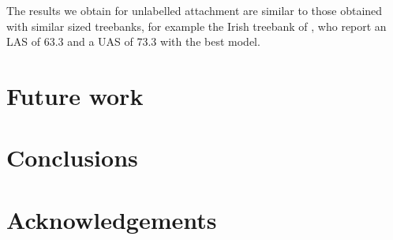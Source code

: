 \documentclass[a4paper,11pt, onecolumn,twoside]{article}
\begin{document}
The results we obtain for unlabelled attachment are similar to those obtained with similar 
sized treebanks, for example the Irish treebank of \cite{Lynn12}, who report an LAS of
63.3 and a UAS of 73.3 with the best model.


\section{Future work}




\section{Conclusions}

\section*{Acknowledgements}


%
%
\printbibliography
\end{document}
